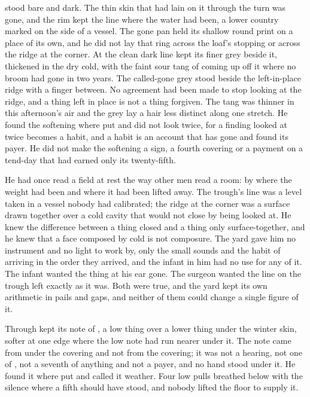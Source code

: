 stood bare and dark. The thin skin that had lain on it through the turn was gone, and the rim kept the line where the water had been, a lower country marked on the side of a vessel. The gone pan held its shallow round print on a place of its own, and he did not lay that ring across the loaf's stopping or across the ridge at the corner. At  the clean dark line kept its finer grey beside it, thickened in the dry cold, with the faint sour tang of  coming up off it where no broom had gone in two years. The called-gone grey stood beside the left-in-place ridge with a finger between. No agreement had been made to stop looking at the ridge, and a thing left in place is not a thing forgiven. The tang was thinner in this afternoon's air and the grey lay a hair less distinct along one stretch. He found the softening where put and did not look twice, for a finding looked at twice becomes a habit, and a habit is an account that has gone and found its payer. He did not make the softening a sign, a fourth covering or a payment on a tend-day that had earned only its twenty-fifth.

He had once read a field at rest the way other men read a room: by where the weight had been and where it had been lifted away. The trough's line was a level taken in a vessel nobody had calibrated; the ridge at the corner was a surface drawn together over a cold cavity that would not close by being looked at. He knew the difference between a thing closed and a thing only surface-together, and he knew that a face composed by cold is not composure. The yard gave him no instrument and no light to work by, only the small sounds and the habit of arriving in the order they arrived, and the infant in him had no use for any of it. The infant wanted the thing at his ear gone. The surgeon wanted the line on the trough left exactly as it was. Both were true, and the yard kept its own arithmetic in pails and gaps, and neither of them could change a single figure of it.

\scenebreak

Through   kept its note of , a low thing over a lower thing under the winter skin, softer at one edge where the low note had run nearer under it. The note came from under the covering and not from the covering; it was not a hearing, not one of , not a seventh of anything and not a payer, and no hand stood under it. He found it where put and called it weather. Four low pulls breathed below  with the silence where a fifth should have stood, and nobody lifted the floor to supply it.

